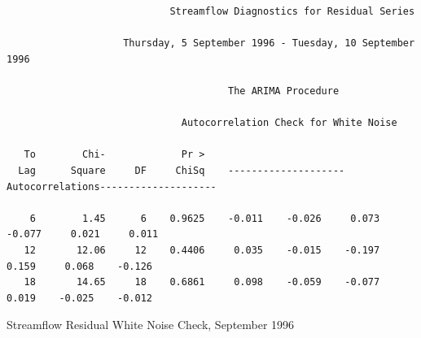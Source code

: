 \documentclass[12pt]{report}
\begin{document}
\begin{table} \scriptsize
\begin{centering}
\begin{verbatim}
                            Streamflow Diagnostics for Residual Series

                    Thursday, 5 September 1996 - Tuesday, 10 September 1996

                                      The ARIMA Procedure

                              Autocorrelation Check for White Noise

   To        Chi-             Pr >
  Lag      Square     DF     ChiSq    --------------------Autocorrelations--------------------

    6        1.45      6    0.9625    -0.011    -0.026     0.073    -0.077     0.021     0.011
   12       12.06     12    0.4406     0.035    -0.015    -0.197     0.159     0.068    -0.126
   18       14.65     18    0.6861     0.098    -0.059    -0.077     0.019    -0.025    -0.012

\end{verbatim}
\end{centering}\normalsize\caption{Streamflow Residual White Noise Check, September 1996}\label{fig:sepflowwht}
\end{table}
\end{document}
